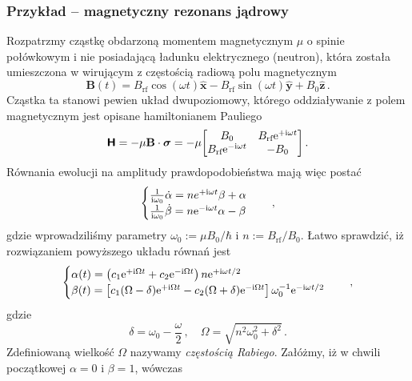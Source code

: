 \documentclass{myclass}
\begin{document}
\subsubsection{Przykład -- magnetyczny rezonans jądrowy }
Rozpatrzmy cząstkę obdarzoną momentem magnetycznym \(\mu\) o spinie połówkowym i nie posiadającą
ładunku elektrycznego (neutron), która została umieszczona w wirującym z częstością radiową polu
magnetycznym
\begin{equation*}
    \mathbf{B}(t) = B_\text{rf}\cos(\omega t)\mathbf{\hat{x}} - B_\text{rf}\sin(\omega t) \mathbf{\hat{y}} + B_0\mathbf{\hat{z}}\,.
\end{equation*}
Cząstka ta stanowi pewien układ dwupoziomowy, którego oddziaływanie z polem magnetycznym jest
opisane hamiltonianem Pauliego
\begin{equation*}
    \oper{H} = -\mu\mathbf{B}\cdot\boldsymbol{\sigma} = -\mu\mqty[B_0 & B_\text{rf}\e^{+\im\omega t} \\ B_\text{rf}\e^{-\im\omega t} & -B_0]\,.
\end{equation*}
Równania ewolucji na amplitudy prawdopodobieństwa mają więc postać
\begin{equation*}
    \begin{cases}
        \frac{1}{\mathrm{i}\omega_0}\dot{\alpha} =n e^{+\mathrm{i}\omega t}\beta + \alpha \\
        \frac{1}{\mathrm{i}\omega_0}\dot{\beta} = n \mathrm{e}^{-\mathrm{i}\omega t}\alpha - \beta
    \end{cases}\quad,
\end{equation*}
gdzie wprowadziliśmy parametry \(\omega_0 := \mu B_0 / \hbar\) i \(n := B_\text{rf}/B_0\). Łatwo
sprawdzić, iż rozwiązaniem powyższego układu równań jest
\begin{equation*}
    \begin{cases}
        \alpha(t) = \left(c_1 \mathrm{e}^{+\mathrm{i}\Omega t} + c_2 \mathrm{e}^{-\mathrm{i} \Omega t}\right) n \mathrm{e}^{+\mathrm{i}\omega t / 2}\\
        \beta(t)  = \left[c_1 (\Omega - \delta)\mathrm{e}^{+\mathrm{i}\Omega t} - c_2 (\Omega + \delta)\mathrm{e}^{-\mathrm{i}\Omega t}\right]\omega_0^{-1}\mathrm{e}^{-\mathrm{i}\omega t / 2} 
    \end{cases}\quad,
\end{equation*}
gdzie
\begin{equation*}
    \delta = \omega_0 - \frac{\omega}{2}\,,\quad \Omega = \sqrt{n^2\omega_0^2 + \delta^2}\,.
\end{equation*}
Zdefiniowaną wielkość \(\Omega\) nazywamy \textit{częstością Rabiego}. Załóżmy, iż w chwili
początkowej \(\alpha = 0\) i \(\beta = 1\), wówczas
\end{document}
